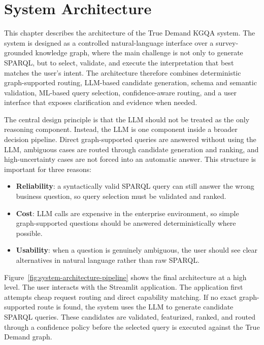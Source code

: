 \chapter{System Architecture}
\label{chap:system-architecture}

This chapter describes the architecture of the True Demand KGQA system. The system is designed as a controlled natural-language interface over a survey-grounded knowledge graph, where the main challenge is not only to generate SPARQL, but to select, validate, and execute the interpretation that best matches the user's intent. The architecture therefore combines deterministic graph-supported routing, LLM-based candidate generation, schema and semantic validation, ML-based query selection, confidence-aware routing, and a user interface that exposes clarification and evidence when needed.

The central design principle is that the LLM should not be treated as the only reasoning component. Instead, the LLM is one component inside a broader decision pipeline. Direct graph-supported queries are answered without using the LLM, ambiguous cases are routed through candidate generation and ranking, and high-uncertainty cases are not forced into an automatic answer. This structure is important for three reasons:

\begin{itemize}
    \item \textbf{Reliability}: a syntactically valid SPARQL query can still answer the wrong business question, so query selection must be validated and ranked.
    \item \textbf{Cost}: LLM calls are expensive in the enterprise environment, so simple graph-supported questions should be answered deterministically where possible.
    \item \textbf{Usability}: when a question is genuinely ambiguous, the user should see clear alternatives in natural language rather than raw SPARQL.
\end{itemize}

Figure~\ref{fig:system-architecture-pipeline} shows the final architecture at a high level. The user interacts with the Streamlit application. The application first attempts cheap request routing and direct capability matching. If no exact graph-supported route is found, the system uses the LLM to generate candidate SPARQL queries. These candidates are validated, featurized, ranked, and routed through a confidence policy before the selected query is executed against the True Demand graph.

